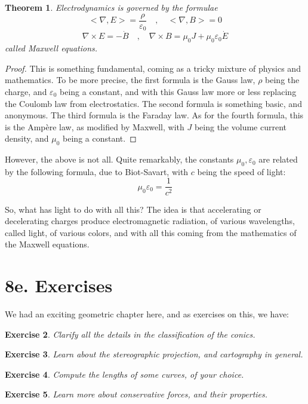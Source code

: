 \documentclass[12pt]{amsbook}
\newtheorem{theorem}{Theorem}[chapter]
\newtheorem{exercise}[theorem]{Exercise}
\begin{document}
\begin{theorem}
Electrodynamics is governed by the formulae
$$<\nabla,E>=\frac{\rho}{\varepsilon_0}\quad,\quad 
<\nabla,B>=0$$
$$\nabla\times E=-\dot{B}\quad,\quad 
\nabla\times B=\mu_0J+\mu_0\varepsilon_0\dot{E}$$
called Maxwell equations.
\end{theorem}

\begin{proof}
This is something fundamental, coming as a tricky mixture of physics and mathematics. To be more precise, the first formula is the Gauss law, $\rho$ being the charge, and $\varepsilon_0$ being a constant, and with this Gauss law more or less replacing the Coulomb law from electrostatics. The second formula is something basic, and anonymous. The third formula is the Faraday law. As for the fourth formula, this is the Amp\`ere law, as modified by Maxwell, with $J$ being the volume current density, and $\mu_0$ being a constant.
\end{proof}

However, the above is not all. Quite remarkably, the constants $\mu_0,\varepsilon_0$ are related by the following formula, due to Biot-Savart, with $c$ being the speed of light: 
$$\mu_0\varepsilon_0=\frac{1}{c^2}$$

So, what has light to do with all this? The idea is that accelerating or decelerating charges produce electromagnetic radiation, of various wavelengths, called light, of various colors, and with all this coming from the mathematics of the Maxwell equations.

\section*{8e. Exercises}

We had an exciting geometric chapter here, and as exercises on this, we have:

\begin{exercise}
Clarify all the details in the classification of the conics.
\end{exercise}

\begin{exercise}
Learn about the stereographic projection, and cartography in general.
\end{exercise}

\begin{exercise}
Compute the lengths of some curves, of your choice.
\end{exercise}

\begin{exercise}
Learn more about conservative forces, and their properties.
\end{exercise}
\end{document}
